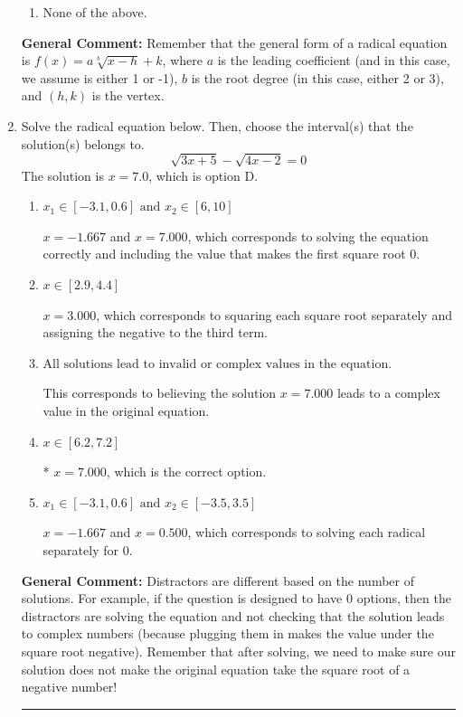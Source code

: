 \documentclass{extbook}[14pt]
\newcommand{\litem}[1]{\item #1

\rule{\textwidth}{0.4pt}}
\begin{document}
\begin{enumerate}
{\begin{enumerate}[label=\Alph*.]
\item None of the above.\end{enumerate}
\textbf{General Comment:} Remember that the general form of a radical equation is $ f(x) = a \sqrt[b]{x - h} + k $, where $a$ is the leading coefficient (and in this case, we assume is either 1 or -1), $b$ is the root degree (in this case, either 2 or 3), and $(h, k)$ is the vertex.
}
\litem{
Solve the radical equation below. Then, choose the interval(s) that the solution(s) belongs to.
\[ \sqrt{3 x + 5} - \sqrt{4 x - 2} = 0 \]The solution is \( x = 7.0 \), which is option D.\begin{enumerate}[label=\Alph*.]
\item \( x_1 \in [-3.1, 0.6] \text{ and } x_2 \in [6,10] \)

$x = -1.667$ and $x = 7.000$, which corresponds to solving the equation correctly and including the value that makes the first square root 0.
\item \( x \in [2.9,4.4] \)

$x = 3.000$, which corresponds to squaring each square root separately and assigning the negative to the third term.
\item \( \text{All solutions lead to invalid or complex values in the equation.} \)

This corresponds to believing the solution $x = 7.000$ leads to a complex value in the original equation.
\item \( x \in [6.2,7.2] \)

* $x = 7.000$, which is the correct option.
\item \( x_1 \in [-3.1, 0.6] \text{ and } x_2 \in [-3.5,3.5] \)

$x = -1.667$ and $x = 0.500$, which corresponds to solving each radical separately for 0.
\end{enumerate}

\textbf{General Comment:} Distractors are different based on the number of solutions. For example, if the question is designed to have 0 options, then the distractors are solving the equation and not checking that the solution leads to complex numbers (because plugging them in makes the value under the square root negative). Remember that after solving, we need to make sure our solution does not make the original equation take the square root of a negative number!
}
\end{enumerate}
\end{document}
